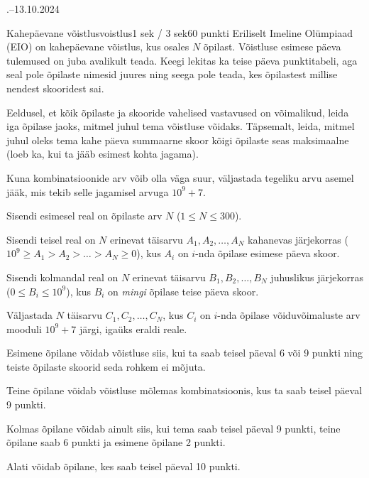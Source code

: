 \documentclass[a4paper,11pt]{article}
\begin{document}
\begin{ol}{\eio}{.--13.10.2024}{\yle}{}
  \begin{yl}{4}{Kahepäevane võistlus}{voistlus}{1 sek / 3 sek}{60 punkti}
    Eriliselt Imeline Olümpiaad (EIO) on kahepäevane võistlus, kus osales $N$ õpilast.
    Võistluse esimese päeva tulemused on juba avalikult teada. Keegi lekitas ka
    teise päeva punktitabeli, aga seal pole õpilaste nimesid juures ning seega
    pole teada, kes õpilastest millise nendest skooridest sai.

    Eeldusel, et kõik õpilaste ja skooride vahelised vastavused on võimalikud, leida
    iga õpilase jaoks, mitmel juhul tema võistluse võidaks. Täpsemalt, leida, mitmel juhul
    oleks tema kahe päeva summaarne skoor kõigi õpilaste seas maksimaalne (loeb ka, kui
    ta jääb esimest kohta jagama).

    Kuna kombinatsioonide arv võib olla väga suur, väljastada tegeliku arvu
    asemel jääk, mis tekib selle jagamisel arvuga $10^9+7$.

    \sis Sisendi esimesel real on õpilaste arv $N$ ($1 \le N \le 300$).

    Sisendi teisel real on $N$ erinevat täisarvu $A_1, A_2, \ldots, A_N$ kahanevas
    järjekorras ($10^9 \ge A_1 > A_2 > \ldots > A_N \ge 0$), kus $A_i$ on $i$-nda õpilase
    esimese päeva skoor. 

    Sisendi kolmandal real on $N$ erinevat täisarvu $B_1, B_2, \ldots, B_N$ juhuslikus 
    järjekorras ($0 \le B_i \le 10^9$), kus $B_i$ on \textit{mingi} õpilase teise päeva skoor. 

    \val Väljastada $N$ täisarvu $C_1, C_2, \ldots, C_N$, kus $C_i$ on 
    $i$-nda õpilase võiduvõimaluste arv mooduli $10^9+7$ järgi, igaüks eraldi reale.

    \nde[0]{3cm}{3cm}

    Esimene õpilane võidab võistluse siis, kui ta saab teisel päeval 6 või 9 punkti ning teiste õpilaste skoorid seda rohkem ei mõjuta.

    Teine õpilane võidab võistluse mõlemas kombinatsioonis, kus ta saab teisel päeval 9 punkti.

    Kolmas õpilane võidab ainult siis, kui tema saab teisel päeval 9 punkti, teine õpilane saab 6 punkti ja esimene õpilane 2 punkti.

    \nde[1]{3cm}{3cm}

    Alati võidab õpilane, kes saab teisel päeval 10 punkti.

    \nde[2]{3cm}{3cm}


\end{yl}
\end{ol}
\end{document}
